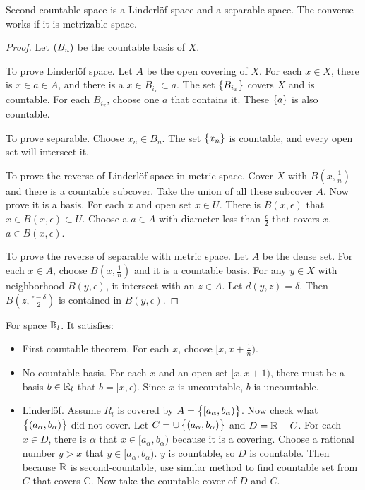 \begin{theorem}
    Second-countable space is a Linderl\"of space and a separable space. The converse works if it is metrizable space.
\end{theorem}
\begin{proof}
    Let $\sequence{B_n}$ be the countable basis of $X$.
    
    To prove Linderl\"of space. Let $A$ be the open covering of $X$. For each $x \in X$, there is $x \in a \in A$, and there is a $x \in B_{i_x} \subset a$. The set $\set{B_{i_x}}$ covers $X$ and is countable. For each $B_{i_x}$, choose one $a$ that contains it. These $\set{a}$ is also countable.
    
    To prove separable. Choose $x_n \in B_n$. The set $\set{x_n}$ is countable, and every open set will intersect it.
    
    To prove the reverse of Linderl\"of space in metric space. Cover $X$ with $B(x, \frac{1}{n})$ and there is a countable subcover. Take the union of all these subcover $A$. Now prove it is a basis. For each $x$ and open set $x \in U$. There is $B(x, \epsilon)$ that $x \in B(x,\epsilon) \subset U$. Choose a $a \in A$ with diameter less than $\frac{\epsilon}{2}$ that covers $x$. $a \in B(x, \epsilon)$.
    
    To prove the reverse of separable with metric space. Let $A$ be the dense set. For each $x \in A$, choose $B(x, \frac{1}{n})$ and it is a countable basis. For any $y \in X$ with neighborhood $B(y, \epsilon)$, it intersect with an $z \in A$. Let $d(y,z) = \delta$. Then $B(z, \frac{\epsilon - \delta}{2})$ is contained in $B(y, \epsilon)$.
\end{proof}

\begin{example}
    For space $\mathbb{R}_l$. It satisfies:
    \begin{itemize}
        \item First countable theorem. For each $x$, choose $[x, x+\frac{1}{n})$.
        \item No countable basis. For each $x$ and an open set $[x,x+1)$, there must be a basis $b \in \mathbb{R}_l$ that $b = [x,\epsilon)$. Since $x$ is uncountable, $b$ is uncountable.
        \item Linderl\"of. Assume $R_l$ is covered by $A = \set{[a_\alpha, b_\alpha)}$. Now check what $\set{(a_\alpha, b_\alpha)}$ did not cover. Let $C = \cup \set{(a_\alpha, b_\alpha)}$ and $D = \mathbb{R} - C$. For each $x \in D$, there is $\alpha$ that $x \in [a_\alpha, b_\alpha)$ because it is a covering. Choose a rational number $y>x$ that $y \in [a_\alpha, b_\alpha)$. $y$ is countable, so $D$ is countable. Then because $\mathbb{R}$ is second-countable, use similar method to find countable set from $C$ that covers C. Now take the countable cover of $D$ and $C$.
    \end{itemize}
\end{example}

